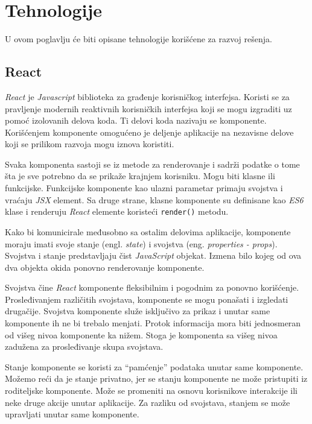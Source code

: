 \chapter{Tehnologije}\label{ch:tehnologije}

U ovom poglavlju će biti opisane tehnologije korišćene za razvoj rešenja.

\section{React}\label{sec:react}
\textit{React} je \textit{Javascript} biblioteka za građenje korisničkog interfejsa. Koristi se za pravljenje modernih 
reaktivnih korisničkih interfejsa koji se mogu izgraditi uz pomoć izolovanih delova koda. Ti delovi koda nazivaju 
se komponente. Korišćenjem komponente omogućeno je deljenje aplikacije na nezavisne delove koji se prilikom razvoja 
mogu iznova koristiti.~\cite{react}

Svaka komponenta sastoji se iz metode za renderovanje i sadrži podatke o tome šta je sve potrebno da se prikaže 
krajnjem korisniku. Mogu biti klasne ili funkcijske. Funkcijske komponente kao ulazni parametar primaju svojstva 
i vraćaju \textit{JSX} element. Sa druge strane, klasne komponente su definisane kao \textit{ES6} 
klase i renderuju \textit{React} elemente koristeći \texttt{render()} metodu. 

Kako bi komunicirale međusobno sa ostalim delovima aplikacije, komponente moraju imati svoje stanje (engl. \textit{state}) 
i svojstva (eng. \textit{properties - props}). Svojstva i stanje predstavljaju čist \textit{JavaScript} objekat. Izmena bilo kojeg 
od ova dva objekta okida ponovno renderovanje komponente. 

Svojstva čine \textit{React} komponente fleksibilnim i pogodnim za 
ponovno korišćenje. Prosleđivanjem različitih svojstava, komponente se mogu ponašati i izgledati drugačije. Svojstva komponente 
služe isključivo za prikaz i unutar same komponente ih ne bi trebalo menjati. Protok informacija mora biti jednosmeran od višeg 
nivoa komponente ka nižem. Stoga je komponenta sa višeg nivoa zadužena za prosleđivanje skupa svojstava.

Stanje komponente se koristi za “pamćenje” podataka unutar same komponente. Možemo reći da je stanje privatno, jer se stanju 
komponente ne može pristupiti iz roditeljske komponente. Može se promeniti na osnovu korisnikove interakcije ili neke druge 
akcije unutar aplikacije. Za razliku od svojstava, stanjem se može upravljati unutar same komponente.

